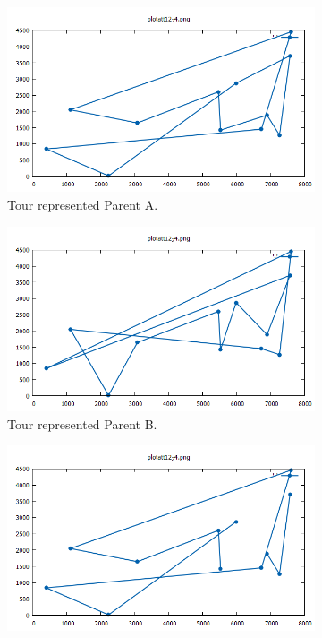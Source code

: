 \begin{figure}[!h]
	\begin{subfigure}{.5\columnwidth}
		\centering
		\includegraphics[width=\columnwidth]{../res/ga_gen_A.png}
		\caption{Tour represented Parent A.}
		\label{fig:ga_gen_A}
	\end{subfigure}
	\begin{subfigure}{.5\columnwidth}
		\centering
		\includegraphics[width=\columnwidth]{../res/ga_gen_B.png}
		\caption{Tour represented Parent B.}
		\label{fig:ga_gen_B}
	\end{subfigure}
	\begin{subfigure}{.5\columnwidth}
		\centering
		\includegraphics[width=\columnwidth]{../res/ga_rm_A.png}

\end{subfigure}
\end{figure}
